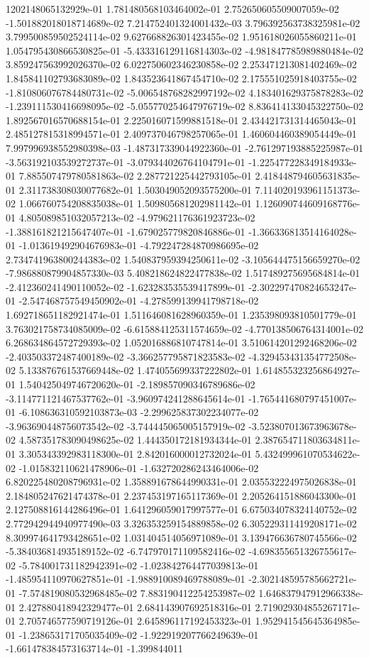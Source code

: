 1202148065132929e-01	1.781480568103464002e-01	2.752650605509007059e-02	-1.501882018018714689e-02	7.214752401324001432e-03	3.796392563738325981e-02	3.799500859502524114e-02	9.627668826301423455e-02	1.951618026055860211e-01	1.054795430866530825e-01	-5.433316129116814303e-02	-4.981847785989880484e-02	3.859247563992026370e-02	6.022750602346230858e-02	2.253471213081402469e-02	1.845841102793683089e-02	1.843523641867454710e-02	2.175551025918403755e-02	-1.810806076784480731e-02	-5.006548768282997192e-02	4.183401629375878283e-02	-1.239111530416698095e-02	-5.055770254647976719e-02	8.836414133045322750e-02	1.892567016570688154e-01	2.225016071599881518e-01	2.434421731314465043e-01	2.485127815318994571e-01	2.409737046798257065e-01	1.460604460389054449e-01	7.997996938552980398e-03	-1.487317339044922360e-01	-2.761297193885225987e-01	-3.563192103539272737e-01	-3.079344026764104791e-01	-1.225477228349184933e-01	7.885507479780581863e-02	2.287721225442793105e-01	2.418448794605631835e-01	2.311738308030077682e-01	1.503049052093575200e-01	7.114020193961151373e-02	1.066760754208835038e-01	1.509805681202981142e-01	1.126090744609168776e-01	4.805089851032057213e-02	-4.979621176361923723e-02	-1.388161821215647407e-01	-1.679025779820846886e-01	-1.366336813514164028e-01	-1.013619492904676983e-01	-4.792247284870986695e-02	2.734741963800244383e-02	1.540837959394250611e-02	-3.105644475156659270e-02	-7.986880879904857330e-03	5.408218624822477838e-02	1.517489275695684814e-01	-2.412360241490110052e-02	-1.623283535539417899e-01	-2.302297470824653247e-01	-2.547468757549450902e-01	-4.278599139941798718e-02	1.692718651182921474e-01	1.511646081628960359e-01	1.235398093810501779e-01	3.763021758734085009e-02	-6.615884125311574659e-02	-4.770138506764314001e-02	6.268634864572729393e-02	1.052016886810747814e-01	3.510614201292468206e-02	-2.403503372487400189e-02	-3.366257795871823583e-02	-4.329453431354772508e-02	5.133876761537669448e-02	1.474055699337222802e-01	1.614855323256864927e-01	1.540425049746720620e-01	-2.189857090346789686e-02	-3.114771121467537762e-01	-3.960974241288645614e-01	-1.765441680797451007e-01	-6.108636310592103873e-03	-2.299625837302234077e-02	-3.963690448756073542e-02	-3.744445065005157919e-02	-3.523807013673963678e-02	4.587351783090498625e-02	1.444350172181934344e-01	2.387654711803634811e-01	3.305343392983118300e-01	2.842016000012732024e-01	5.432499961070534622e-02	-1.015832110621478906e-01	-1.632720286243464006e-02	6.820225480208796931e-02	1.358891678644990331e-01	2.035532224975026838e-01	2.184805247621474378e-01	2.237453197165117369e-01	2.205264151886043300e-01	2.127508816144286496e-01	1.641296059017997577e-01	6.675034078324140752e-02	2.772942944940977490e-03	3.326353259154889858e-02	6.305229311419208171e-02	8.309974641793428651e-02	1.031404514056971089e-01	3.139476636780745566e-02	-5.384036814935189152e-02	-6.747970171109582416e-02	-4.698355651326755617e-02	-5.784001731182942391e-02	-1.023842764477039813e-01	-1.485954110970627851e-01	-1.988910089469788089e-01	-2.302148595785662721e-01	-7.574819080532968485e-02	7.883190412254253987e-02	1.646837947912966338e-01	2.427880418942329477e-01	2.684143907692518316e-01	2.719029304855267171e-01	2.705746577590719126e-01	2.645896117192453323e-01	1.952941545645364985e-01	-1.238653171705035409e-02	-1.922919207766249639e-01	-1.661478384573163714e-01	-1.399844011